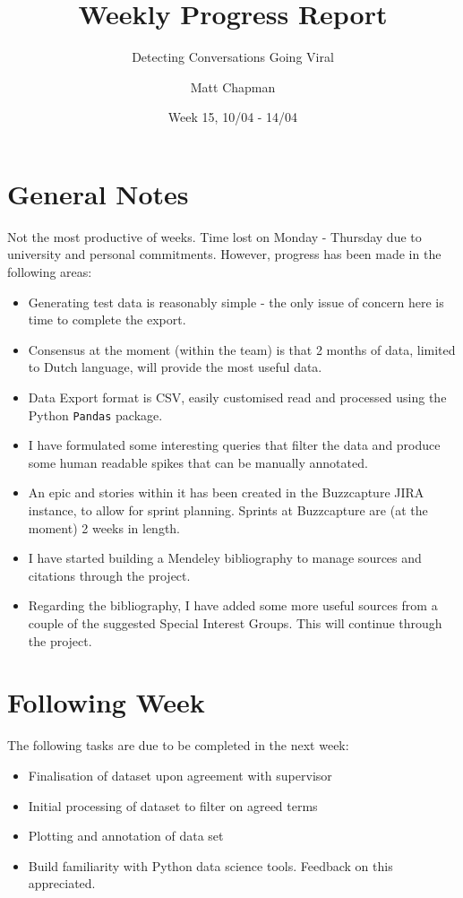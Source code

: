 \documentclass{mattreport}
\title{Weekly Progress Report}
\subtitle{Detecting Conversations Going Viral}
\date{Week 15, 10/04 - 14/04}
\author{Matt Chapman}
\begin{document}
\maketitle

\section{General Notes}

Not the most productive of weeks. Time lost on Monday - Thursday due to university and personal commitments. However, progress has been made in the following areas:

\begin{itemize}
    \item Generating test data is reasonably simple - the only issue of concern here is time to complete the export.
    \item Consensus at the moment (within the team) is that 2 months of data, limited to Dutch language, will provide the most useful data.
    \item Data Export format is CSV, easily customised read and processed using the Python \texttt{Pandas} package.
    \item I have formulated some interesting queries that filter the data and produce some human readable spikes that can be manually annotated.
    \item An epic and stories within it has been created in the Buzzcapture JIRA instance, to allow for sprint planning. Sprints at Buzzcapture are (at the moment) 2 weeks in length.
    \item I have started building a Mendeley bibliography to manage sources and citations through the project.
    \item Regarding the bibliography, I have added some more useful sources from a couple of the suggested Special Interest Groups. This will continue through the project.
\end{itemize}

\section{Following Week}

The following tasks are due to be completed in the next week:

\begin{itemize}
    \item Finalisation of dataset upon agreement with supervisor
    \item Initial processing of dataset to filter on agreed terms
    \item Plotting and annotation of data set
    \item Build familiarity with Python data science tools. Feedback on this appreciated.
\end{itemize}
\end{document}
